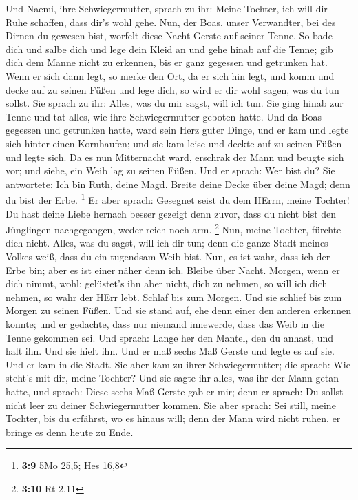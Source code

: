  Und Naemi, ihre Schwiegermutter, sprach zu ihr: Meine
Tochter, ich will dir Ruhe schaffen, dass dir's wohl gehe.
 Nun, der Boas, unser Verwandter, bei des Dirnen du
gewesen bist, worfelt diese Nacht Gerste auf seiner Tenne.
 So bade dich und salbe dich und lege dein Kleid an und
gehe hinab auf die Tenne; gib dich dem Manne nicht zu erkennen, bis er
ganz gegessen und getrunken hat.  Wenn er sich dann legt,
so merke den Ort, da er sich hin legt, und komm und decke auf zu seinen
Füßen und lege dich, so wird er dir wohl sagen, was du tun sollst.
 Sie sprach zu ihr: Alles, was du mir sagst, will ich tun.
 Sie ging hinab zur Tenne und tat alles, wie ihre
Schwiegermutter geboten hatte.  Und da Boas gegessen und
getrunken hatte, ward sein Herz guter Dinge, und er kam und legte sich
hinter einen Kornhaufen; und sie kam leise und deckte auf zu seinen
Füßen und legte sich.  Da es nun Mitternacht ward,
erschrak der Mann und beugte sich vor; und siehe, ein Weib lag zu seinen
Füßen.  Und er sprach: Wer bist du? Sie antwortete: Ich
bin Ruth, deine Magd. Breite deine Decke über deine Magd; denn du bist
der Erbe. \footnote{\textbf{3:9} 5Mo 25,5; Hes 16,8}  Er
aber sprach: Gesegnet seist du dem HErrn, meine Tochter! Du hast deine
Liebe hernach besser gezeigt denn zuvor, dass du nicht bist den
Jünglingen nachgegangen, weder reich noch arm. \footnote{\textbf{3:10}
  Rt 2,11}  Nun, meine Tochter, fürchte dich nicht.
Alles, was du sagst, will ich dir tun; denn die ganze Stadt meines
Volkes weiß, dass du ein tugendsam Weib bist.  Nun, es
ist wahr, dass ich der Erbe bin; aber es ist einer näher denn ich.
 Bleibe über Nacht. Morgen, wenn er dich nimmt, wohl;
gelüstet's ihn aber nicht, dich zu nehmen, so will ich dich nehmen, so
wahr der HErr lebt. Schlaf bis zum Morgen.  Und sie
schlief bis zum Morgen zu seinen Füßen. Und sie stand auf, ehe denn
einer den anderen erkennen konnte; und er gedachte, dass nur niemand
innewerde, dass das Weib in die Tenne gekommen sei.  Und
sprach: Lange her den Mantel, den du anhast, und halt ihn. Und sie hielt
ihn. Und er maß sechs Maß Gerste und legte es auf sie. Und er kam in die
Stadt.  Sie aber kam zu ihrer Schwiegermutter; die
sprach: Wie steht's mit dir, meine Tochter? Und sie sagte ihr alles, was
ihr der Mann getan hatte,  und sprach: Diese sechs Maß
Gerste gab er mir; denn er sprach: Du sollst nicht leer zu deiner
Schwiegermutter kommen.  Sie aber sprach: Sei still,
meine Tochter, bis du erfährst, wo es hinaus will; denn der Mann wird
nicht ruhen, er bringe es denn heute zu Ende.


